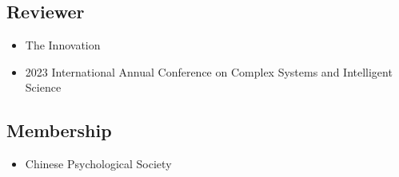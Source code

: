 \documentclass[11pt,a4paper,]{awesome-cv}
\providecommand{\tightlist}{%
	\setlength{\itemsep}{0pt}\setlength{\parskip}{0pt}}
\begin{document}
\vspace{1.5mm}

\subsection{Reviewer}\label{reviewer}

\begin{itemize}
\tightlist
\item
  The Innovation
\item
  2023 International Annual Conference on Complex Systems and
  Intelligent Science
\end{itemize}

\subsection{Membership}\label{membership}

\begin{itemize}
\tightlist
\item
  Chinese Psychological Society
\end{itemize}
\end{document}
